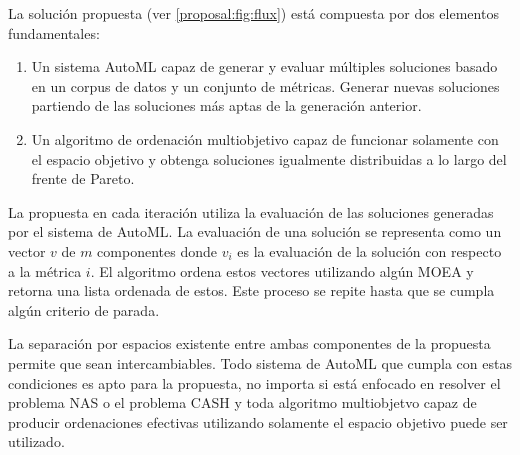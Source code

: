 La soluci\'on propuesta (ver \ref{proposal:fig:flux}) est\'a compuesta por dos elementos fundamentales:
\begin{enumerate}
    \item Un sistema AutoML capaz de generar y evaluar m\'ultiples soluciones basado en un corpus de datos y un conjunto de m\'etricas. Generar nuevas soluciones partiendo de las soluciones m\'as aptas de la generaci\'on anterior.
    \item Un algoritmo de ordenaci\'on multiobjetivo capaz de funcionar solamente con el espacio objetivo y obtenga soluciones igualmente distribuidas a lo largo del frente de Pareto.
\end{enumerate}

La propuesta en cada iteraci\'on utiliza la evaluaci\'on de las soluciones generadas por el sistema de AutoML. La evaluaci\'on de una soluci\'on se representa como un vector $v$ de $m$ componentes donde $v_i$ es la evaluaci\'on de la soluci\'on con respecto a la m\'etrica $i$. El algoritmo ordena estos vectores utilizando alg\'un MOEA y retorna una lista ordenada de estos. Este proceso se repite hasta que se cumpla alg\'un criterio de parada.

La separaci\'on  por espacios existente entre ambas componentes de la propuesta permite que sean intercambiables. Todo sistema de AutoML que cumpla con estas condiciones es apto para la propuesta, no importa si est\'a enfocado en resolver el problema NAS o el problema CASH y toda algoritmo multiobjetvo capaz de producir ordenaciones efectivas utilizando solamente el espacio objetivo puede ser utilizado.


